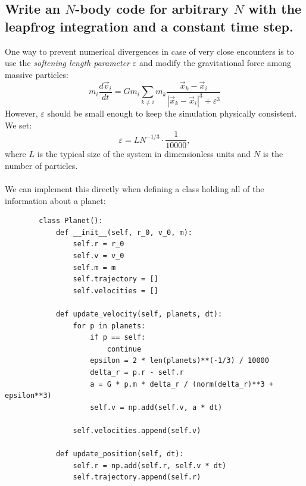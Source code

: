\newpage
\subsection{Write an $N$-body code for arbitrary $N$ with the leapfrog 
    integration and a constant time step.
} 
    One way to prevent numerical divergences in case of very close encounters 
    is to use the \textit{softening length parameter} $\varepsilon$ and modify 
    the gravitational force among massive particles:
    \begin{equation}
        m_i\frac{d\vec v_i}{dt}
        =Gm_i\sum_{k\neq i}m_k\frac{\vec x_k-\vec x_i}
        {|\vec x_k-\vec x_i|^3 + \varepsilon^3}
    \end{equation}
    However, $\varepsilon$ should be small enough to keep the simulation 
    physically consistent. We set:
    \begin{equation}
        \varepsilon=LN^{-1/3}\cdot\frac{1}{10000},
    \end{equation}
    where $L$ is the typical size of the system in dimensionless units and 
    $N$ is the number of particles. \\
    \\
    We can implement this directly when defining a class holding all of the 
    information about a planet:
    \begin{lstlisting}
        class Planet():
            def __init__(self, r_0, v_0, m):
                self.r = r_0
                self.v = v_0
                self.m = m
                self.trajectory = []
                self.velocities = []
        
            def update_velocity(self, planets, dt):
                for p in planets:
                    if p == self:
                        continue
                    epsilon = 2 * len(planets)**(-1/3) / 10000
                    delta_r = p.r - self.r
                    a = G * p.m * delta_r / (norm(delta_r)**3 + epsilon**3)
                    self.v = np.add(self.v, a * dt)
        
                self.velocities.append(self.v)
        
            def update_position(self, dt):
                self.r = np.add(self.r, self.v * dt)
                self.trajectory.append(self.r) \end{lstlisting}

